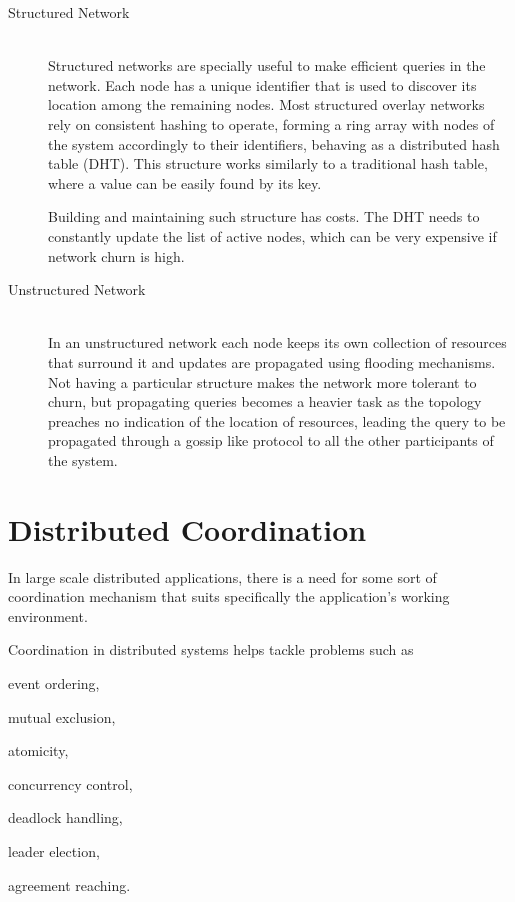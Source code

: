 \begin{description}
\item[Structured Network] \hfill \\
Structured networks are specially useful to make efficient queries in the network. Each node has a unique identifier that is used to discover its location among the remaining nodes. Most structured overlay networks rely on consistent hashing to operate, forming a ring array with nodes of the system accordingly to their identifiers, behaving as a distributed hash table (DHT). This structure works similarly to a traditional hash table, where a value can be easily found by its key.\par
	Building and maintaining such structure has costs. The DHT needs to constantly update the list of active nodes, which can be very expensive if network churn is high.

\item[Unstructured Network] \hfill \\
In an unstructured network each node keeps its own collection of resources that surround it and updates are propagated using flooding mechanisms. Not having a particular structure makes the network more tolerant to churn, but propagating queries becomes a heavier task as the topology preaches no indication of the location of resources, leading the query to be propagated through a gossip like protocol to all the other participants of the system.
\end{description}
	
\section{Distributed Coordination}
\label{sec:distributed_coordination}

In large scale distributed applications, there is a need for some sort of coordination mechanism that suits specifically the application's working environment.\par
	Coordination in distributed systems helps tackle problems such as\cite{distributed}
\begin{enumerate*}[(i)]
\item event ordering,
\item mutual exclusion,
\item atomicity,
\item concurrency control,
\item deadlock handling,
\item leader election,
\item agreement reaching.
\end{enumerate*}

